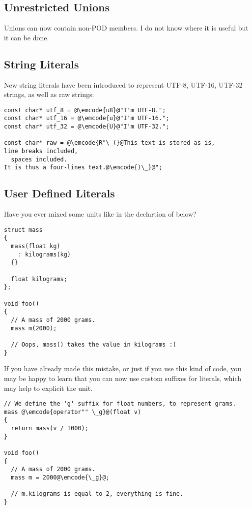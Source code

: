 \subsection{Unrestricted Unions}

Unions can now contain non-POD members. I do not know where it is
useful but it can be done.

\subsection{String Literals}

New string literals have been introduced to represent UTF-8, UTF-16,
UTF-32 strings, as well as raw strings:

\begin{lstlisting}
const char* utf_8 = @\emcode{u8}@"I'm UTF-8.";
const char* utf_16 = @\emcode{u}@"I'm UTF-16.";
const char* utf_32 = @\emcode{U}@"I'm UTF-32.";

const char* raw = @\emcode{R"\_(}@This text is stored as is,
line breaks included,
  spaces included.
It is thus a four-lines text.@\emcode{)\_}@";
\end{lstlisting}

\subsection{User Defined Literals}

Have you ever mixed some units like in the declartion of  below?

\begin{lstlisting}
struct mass
{
  mass(float kg)
    : kilograms(kg)
  {}

  float kilograms;
};

void foo()
{
  // A mass of 2000 grams.
  mass m(2000);

  // Oops, mass() takes the value in kilograms :(
}
\end{lstlisting}

If you have already made this mistake, or just if you use this kind of
code, you may be happy to learn that you can now use custom suffixes
for literals, which may help to explicit the unit.

\begin{lstlisting}
// We define the 'g' suffix for float numbers, to represent grams.
mass @\emcode{operator"" \_g}@(float v)
{
  return mass(v / 1000);
}

void foo()
{
  // A mass of 2000 grams.
  mass m = 2000@\emcode{\_g}@;

  // m.kilograms is equal to 2, everything is fine.
}
\end{lstlisting}

